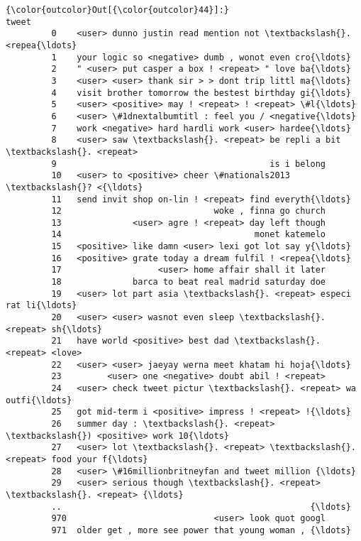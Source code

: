 \documentclass[11pt]{article}
\begin{document}
\begin{Verbatim}[commandchars=\\\{\}]
{\color{outcolor}Out[{\color{outcolor}44}]:}                                                  tweet
         0    <user> dunno justin read mention not \textbackslash{}. <repea{\ldots}
         1    your logic so <negative> dumb , wonot even cro{\ldots}
         2    " <user> put casper a box ! <repeat> " love ba{\ldots}
         3    <user> <user> thank sir > > dont trip littl ma{\ldots}
         4    visit brother tomorrow the bestest birthday gi{\ldots}
         5    <user> <positive> may ! <repeat> ! <repeat> \#l{\ldots}
         6    <user> \#1dnextalbumtitl : feel you / <negative{\ldots}
         7    work <negative> hard hardli work <user> hardee{\ldots}
         8    <user> saw \textbackslash{}. <repeat> be repli a bit \textbackslash{}. <repeat>
         9                                          is i belong
         10   <user> to <positive> cheer \#nationals2013 \textbackslash{}? <{\ldots}
         11   send invit shop on-lin ! <repeat> find everyth{\ldots}
         12                              woke , finna go church
         13              <user> agre ! <repeat> day left though
         14                                      monet katemelo
         15   <positive> like damn <user> lexi got lot say y{\ldots}
         16   <positive> grate today a dream fulfil ! <repea{\ldots}
         17                   <user> home affair shall it later
         18              barca to beat real madrid saturday doe
         19   <user> lot part asia \textbackslash{}. <repeat> especi rat li{\ldots}
         20   <user> <user> wasnot even sleep \textbackslash{}. <repeat> sh{\ldots}
         21   have world <positive> best dad \textbackslash{}. <repeat> <love>
         22   <user> <user> jaeyay werna meet khatam hi hoja{\ldots}
         23         <user> one <negative> doubt abil ! <repeat>
         24   <user> check tweet pictur \textbackslash{}. <repeat> wa outfi{\ldots}
         25   got mid-term i <positive> impress ! <repeat> !{\ldots}
         26   summer day : \textbackslash{}. <repeat> \textbackslash{}) <positive> work 10{\ldots}
         27   <user> lot \textbackslash{}. <repeat> \textbackslash{}. <repeat> food your f{\ldots}
         28   <user> \#16millionbritneyfan and tweet million {\ldots}
         29   <user> serious though \textbackslash{}. <repeat> \textbackslash{}. <repeat> {\ldots}
         ..                                                 {\ldots}
         970                             <user> look quot googl
         971  older get , more see power that young woman , {\ldots}

\end{Verbatim}
\end{document}
